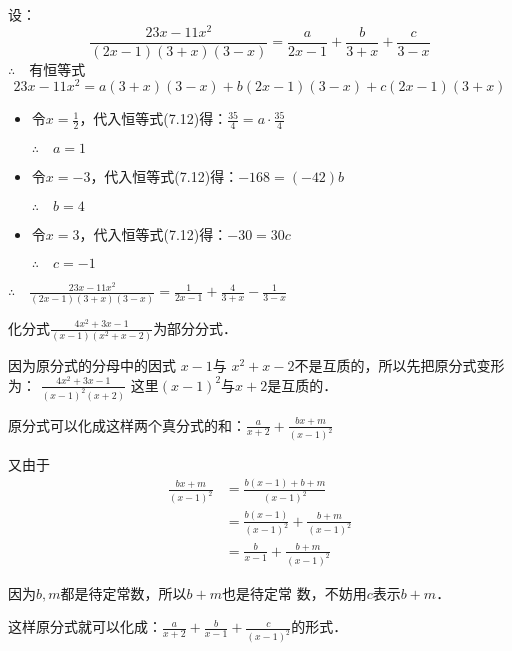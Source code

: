 \begin{solution}
设：
\begin{equation}
    \frac{23x-11x^2}{(2x-1)(3+x)(3-x)}=\frac{a}{2x-1}+\frac{b}{3+x}+\frac{c}{3-x}
\end{equation}
$\therefore\quad $有恒等式
\begin{equation}
    23x-11x^2=a(3+x)(3-x)+b(2x-1)(3-x)+c(2x-1)(3+x)
\end{equation}

\begin{itemize}
    \item 令$x=\frac{1}{2}$，代入恒等式(7.12)得：$\frac{35}{4}=a\cdot \frac{35}{4}$
    
    $\therefore\quad a=1$
    \item 令$x=-3$，代入恒等式(7.12)得：$-168=(-42)b$
    
    $\therefore\quad b=4$
    \item 令$x=3$，代入恒等式(7.12)得：$-30=30c$
    
    $\therefore\quad c=-1$
\end{itemize}
$\therefore\quad  \frac{23x-11x^2}{(2x-1)(3+x)(3-x)}=\frac{1}{2x-1}+\frac{4}{3+x}-\frac{1}{3-x}$
\end{solution}

\begin{example}
    化分式$\frac{4x^2+3x-1}{(x-1)(x^2+x-2)}$为部分分式．
\end{example}

\begin{analyze}
    因为原分式的分母中的因式
    $x-1$与
    $x^2+x-2$不是互质的，所以先把原分式变形为：
    $\frac{4x^2+3x-1}{(x-1)^2(x+2)}$
    这里$(x-1)^2$与$x+2$是互质的．
    
    原分式可以化成这样两个真分式的和：$\frac{a}{x+2}+\frac{bx+m}{(x-1)^2}$

    又由于
\[\begin{split}
    \frac{bx+m}{(x-1)^2}&=\frac{b(x-1)+b+m}{(x-1)^2}\\
    &=\frac{b(x-1)}{(x-1)^2}+\frac{b+m}{(x-1)^2}\\
    &=\frac{b}{x-1}+\frac{b+m}{(x-1)^2}
\end{split}\]

因为$b,m$都是待定常数，所以$b+m$也是待定常
数，不妨用$c$表示$b+m$．

这样原分式就可以化成：$\frac{a}{x+2}+\frac{b}{x-1}+\frac{c}{(x-1)^2}$的形式．
\end{analyze}

